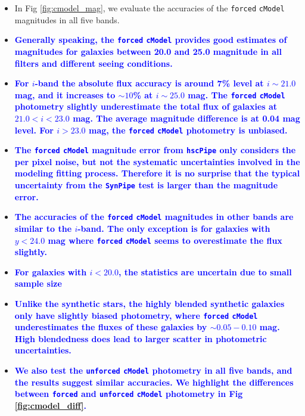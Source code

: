 \documentclass[useamsfonts]{pasj01}
\def\hscpipe{\texttt{hscPipe}}
\def\synpipe{\texttt{SynPipe}}
\def\cmodel{\texttt{cModel}}
\def\forced{\texttt{forced}}
\def\unforced{\texttt{unforced}}
\newcommand{\plan}[1]{\textcolor{blue} {\textbf{#1}}}
\begin{document}
    \begin{itemize}

        \item In Fig \ref{fig:cmodel_mag}, we evaluate the accuracies of the \forced{}
            \cmodel{} magnitudes in all five bands.

        \item \plan{Generally speaking, the \forced{} \cmodel{} provides good estimates
            of magnitudes for galaxies between 20.0 and 25.0 magnitude in all filters and
            different seeing conditions. }

        \item \plan{For $i$-band the absolute flux accuracy is around 7\% level at
            $i{\sim}21.0$ mag, and it increases to ${\sim}10$\% at $i{\sim}25.0$ mag.
            The \forced{} \cmodel{} photometry slightly underestimate the total flux of
            galaxies at $21.0 < i < 23.0$ mag.
            The average magnitude difference is at 0.04 mag level.
            For $i > 23.0$ mag, the \forced{} \cmodel{} photometry is unbiased.}

        \item \plan{The \forced{} \cmodel{} magnitude error from \hscpipe{} only considers
            the per pixel noise, but not the systematic uncertainties involved in the
            modeling fitting process.
            Therefore it is no surprise that the typical uncertainty from the \synpipe{}
            test is larger than the magnitude error.}

        \item \plan{The accuracies of the \forced{} \cmodel{} magnitudes in other bands
            are similar to the $i$-band.
            The only exception is for galaxies with $y<24.0$ mag where \forced{} \cmodel{}
            seems to overestimate the flux slightly.}

        \item \plan{For galaxies with $i < 20.0$, the statistics are uncertain due to small
            sample size}

        \item \plan{Unlike the synthetic stars, the highly blended synthetic galaxies only
            have slightly biased photometry, where \forced{} \cmodel{} underestimates the
            fluxes of these galaxies by ${\sim}0.05-0.10$ mag.
            High blendedness does lead to larger scatter in photometric uncertainties.}

       \item \plan{We also test the \unforced{} \cmodel{} photometry in all five bands,
           and the results suggest similar accuracies.
           We highlight the differences between \forced{} and
           \unforced{} \cmodel{} photometry in Fig \ref{fig:cmodel_diff}.}

    \end{itemize}
\end{document}
